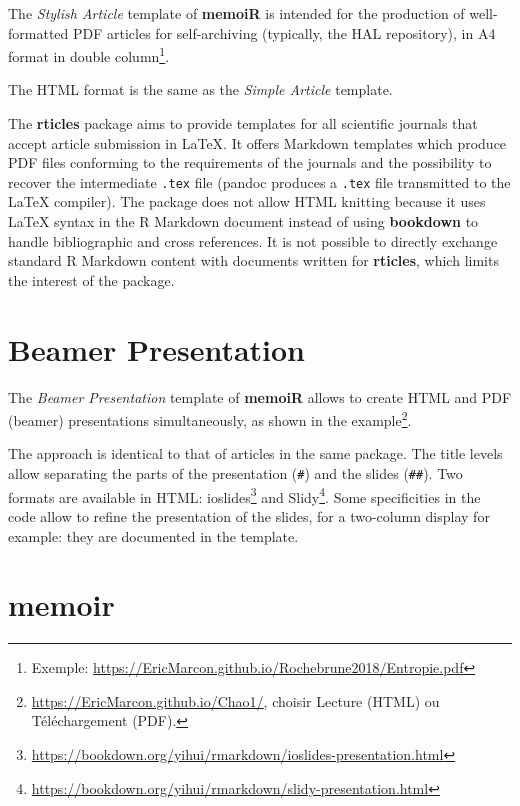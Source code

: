 \documentclass[
  12pt,
  american,
  a4paper,
  extrafontsizes,onecolumn,openright
  ]{memoir}
\begin{document}
The \emph{Stylish Article} template of \textbf{memoiR} is intended for the production of well-formatted PDF articles for self-archiving (typically, the HAL repository), in A4 format in double column\footnote{Exemple: \url{https://EricMarcon.github.io/Rochebrune2018/Entropie.pdf}}.

The HTML format is the same as the \emph{Simple Article} template.

The \textbf{rticles} package aims to provide templates for all scientific journals that accept article submission in LaTeX.
It offers Markdown templates which produce PDF files conforming to the requirements of the journals and the possibility to recover the intermediate \texttt{.tex} file (pandoc produces a \texttt{.tex} file transmitted to the LaTeX compiler).
The package does not allow HTML knitting because it uses LaTeX syntax in the R Markdown document instead of using \textbf{bookdown} to handle bibliographic and cross references.
It is not possible to directly exchange standard R Markdown content with documents written for \textbf{rticles}, which limits the interest of the package.

\hypertarget{beamer-presentation}{%
\section{Beamer Presentation}\label{beamer-presentation}}

The \emph{Beamer Presentation} template of \textbf{memoiR} allows to create HTML and PDF (beamer) presentations simultaneously, as shown in the example\footnote{\url{https://EricMarcon.github.io/Chao1/}, choisir Lecture (HTML) ou Téléchargement (PDF).}.

The approach is identical to that of articles in the same package.
The title levels allow separating the parts of the presentation (\texttt{\#}) and the slides (\texttt{\#\#}).
Two formats are available in HTML: ioslides\footnote{\url{https://bookdown.org/yihui/rmarkdown/ioslides-presentation.html}} and Slidy\footnote{\url{https://bookdown.org/yihui/rmarkdown/slidy-presentation.html}}.
Some specificities in the code allow to refine the presentation of the slides, for a two-column display for example: they are documented in the template.

\hypertarget{memoir}{%
\section{memoir}\label{memoir}}
\end{document}
